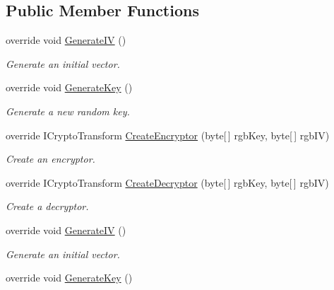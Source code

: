 \subsection*{Public Member Functions}
\begin{DoxyCompactItemize}
\item 
override void \hyperlink{class_i_c_sharp_code_1_1_sharp_zip_lib_1_1_encryption_1_1_pkzip_classic_managed_ad9436f3a0f67531c1052fd08fb0706dc}{Generate\+IV} ()
\begin{DoxyCompactList}\small\item\em Generate an initial vector. \end{DoxyCompactList}\item 
override void \hyperlink{class_i_c_sharp_code_1_1_sharp_zip_lib_1_1_encryption_1_1_pkzip_classic_managed_a2bdce717d1aa95f6a495616685946337}{Generate\+Key} ()
\begin{DoxyCompactList}\small\item\em Generate a new random key. \end{DoxyCompactList}\item 
override I\+Crypto\+Transform \hyperlink{class_i_c_sharp_code_1_1_sharp_zip_lib_1_1_encryption_1_1_pkzip_classic_managed_ade8d45e69497dfb1050df2d7b4d965a0}{Create\+Encryptor} (byte\mbox{[}$\,$\mbox{]} rgb\+Key, byte\mbox{[}$\,$\mbox{]} rgb\+IV)
\begin{DoxyCompactList}\small\item\em Create an encryptor. \end{DoxyCompactList}\item 
override I\+Crypto\+Transform \hyperlink{class_i_c_sharp_code_1_1_sharp_zip_lib_1_1_encryption_1_1_pkzip_classic_managed_ab5ca3dd4dcd6ad0296a104715c233622}{Create\+Decryptor} (byte\mbox{[}$\,$\mbox{]} rgb\+Key, byte\mbox{[}$\,$\mbox{]} rgb\+IV)
\begin{DoxyCompactList}\small\item\em Create a decryptor. \end{DoxyCompactList}\item 
override void \hyperlink{class_i_c_sharp_code_1_1_sharp_zip_lib_1_1_encryption_1_1_pkzip_classic_managed_ad9436f3a0f67531c1052fd08fb0706dc}{Generate\+IV} ()
\begin{DoxyCompactList}\small\item\em Generate an initial vector. \end{DoxyCompactList}\item 
override void \hyperlink{class_i_c_sharp_code_1_1_sharp_zip_lib_1_1_encryption_1_1_pkzip_classic_managed_a2bdce717d1aa95f6a495616685946337}{Generate\+Key} ()

\end{DoxyCompactItemize}
